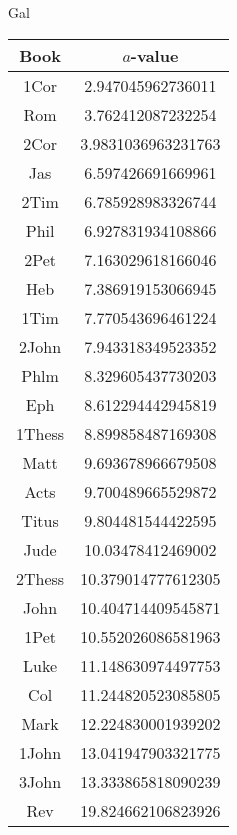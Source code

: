 \documentclass[12pt,letterpaper]{article}
\begin{document}
Gal
\begin{longtable}{|c|c|}
\hline
 Book & $a$-value \\ \hline
1Cor & 2.947045962736011 \\ \hline
 Rom & 3.762412087232254 \\ \hline
 2Cor & 3.9831036963231763 \\ \hline
 Jas & 6.597426691669961 \\ \hline
 2Tim & 6.785928983326744 \\ \hline
 Phil & 6.927831934108866 \\ \hline
 2Pet & 7.163029618166046 \\ \hline
 Heb & 7.386919153066945 \\ \hline
 1Tim & 7.770543696461224 \\ \hline
 2John & 7.943318349523352 \\ \hline
 Phlm & 8.329605437730203 \\ \hline
 Eph & 8.612294442945819 \\ \hline
 1Thess & 8.899858487169308 \\ \hline
 Matt & 9.693678966679508 \\ \hline
 Acts & 9.700489665529872 \\ \hline
 Titus & 9.804481544422595 \\ \hline
 Jude & 10.03478412469002 \\ \hline
 2Thess & 10.379014777612305 \\ \hline
 John & 10.404714409545871 \\ \hline
 1Pet & 10.552026086581963 \\ \hline
 Luke & 11.148630974497753 \\ \hline
 Col & 11.244820523085805 \\ \hline
 Mark & 12.224830001939202 \\ \hline
 1John & 13.041947903321775 \\ \hline
 3John & 13.333865818090239 \\ \hline
 Rev & 19.824662106823926 \\ \hline 
\end{longtable}
\end{document}

